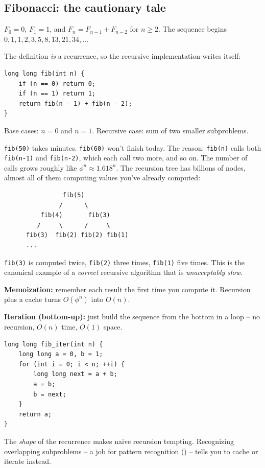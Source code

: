 \documentclass[11pt]{article}
\begin{document}
\subsection{Fibonacci: the cautionary tale}

\begin{defnbox}
$F_0 = 0$, $F_1 = 1$, and $F_n = F_{n-1} + F_{n-2}$ for $n \ge 2$. The
sequence begins $0, 1, 1, 2, 3, 5, 8, 13, 21, 34, \ldots$
\end{defnbox}

The definition \emph{is} a recurrence, so the recursive implementation
writes itself:

\begin{examplebox}
\begin{verbatim}
long long fib(int n) {
    if (n == 0) return 0;
    if (n == 1) return 1;
    return fib(n - 1) + fib(n - 2);
}
\end{verbatim}
Base cases: $n = 0$ and $n = 1$. Recursive case: sum of two smaller
subproblems.
\end{examplebox}

\begin{warnbox}
\texttt{fib(50)} takes minutes. \texttt{fib(60)} won't finish today.
The reason: \texttt{fib(n)} calls both \texttt{fib(n-1)} and
\texttt{fib(n-2)}, which each call two more, and so on. The number of
calls grows roughly like $\phi^n \approx 1.618^n$. The recursion tree
has billions of nodes, almost all of them computing values you've
already computed:
\begin{verbatim}
                fib(5)
               /      \
          fib(4)       fib(3)
         /     \      /     \
      fib(3)  fib(2) fib(2) fib(1)
      ...
\end{verbatim}
\texttt{fib(3)} is computed twice, \texttt{fib(2)} three times,
\texttt{fib(1)} five times. This is the canonical example of a
\emph{correct} recursive algorithm that is \emph{unacceptably slow}.
\end{warnbox}

\begin{ideabox}
\textbf{Memoization:} remember each result the first time you compute
it. Recursion plus a cache turns $O(\phi^n)$ into $O(n)$.

\textbf{Iteration (bottom-up):} just build the sequence from the
bottom in a loop -- no recursion, $O(n)$ time, $O(1)$ space.
\begin{verbatim}
long long fib_iter(int n) {
    long long a = 0, b = 1;
    for (int i = 0; i < n; ++i) {
        long long next = a + b;
        a = b;
        b = next;
    }
    return a;
}
\end{verbatim}
The \emph{shape} of the recurrence makes naive recursion tempting.
Recognizing overlapping subproblems -- a job for pattern recognition
(\textsection 2.3) -- tells you to cache or iterate instead.
\end{ideabox}
\end{document}
